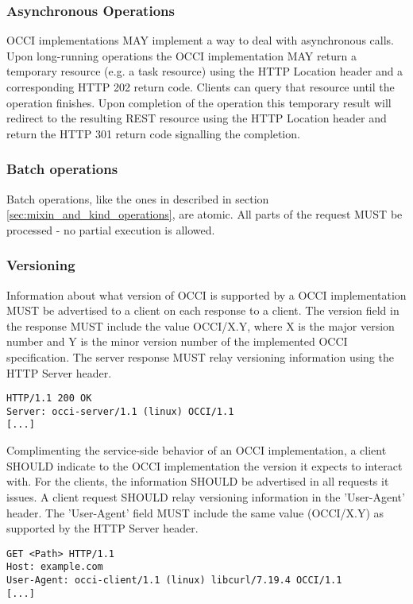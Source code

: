 \documentclass[10pt,a4paper]{article}
\begin{document}
\subsubsection{Asynchronous Operations}
\label{sec:async_ops}
OCCI implementations MAY implement a way to deal with asynchronous
calls. Upon long-running operations the OCCI implementation MAY return
a temporary resource (e.g. a task resource) using the HTTP Location
header and a corresponding HTTP 202 return code. Clients can query
that resource until the operation finishes. Upon completion of the
operation this temporary result will redirect to the resulting REST
resource using the HTTP Location header and return the HTTP 301 return
code signalling the completion.

\subsubsection{Batch operations}
Batch operations, like the ones in described in section
\ref{sec:mixin_and_kind_operations}, are atomic. All parts of the
request MUST be processed - no partial execution is allowed.

\subsubsection{Versioning}
Information about what version of OCCI is supported by a OCCI
implementation MUST be advertised to a client on each response to a
client. The version field in the response MUST include the value
OCCI/X.Y, where X is the major version number and Y is the minor
version number of the implemented OCCI specification. The server
response MUST relay versioning information using the HTTP Server
header.

\begin{verbatim}
HTTP/1.1 200 OK
Server: occi-server/1.1 (linux) OCCI/1.1
[...]
\end{verbatim}

Complimenting the service-side behavior of an OCCI implementation, a
client SHOULD indicate to the OCCI implementation the version it
expects to interact with. For the clients, the information SHOULD be
advertised in all requests it issues. A client request SHOULD relay
versioning information in the 'User-Agent' header. The 'User-Agent'
field MUST include the same value (OCCI/X.Y) as supported by the HTTP
Server header.

\begin{verbatim}
GET <Path> HTTP/1.1
Host: example.com
User-Agent: occi-client/1.1 (linux) libcurl/7.19.4 OCCI/1.1
[...]
\end{verbatim}
\end{document}
